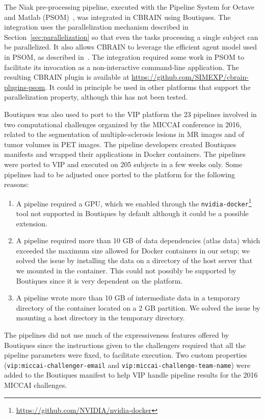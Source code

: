 \documentclass{article}
\begin{document}
The Niak pre-processing pipeline, executed with the Pipeline System
for Octave and Matlab (PSOM)~\cite{bellec2012pipeline}, was integrated
in CBRAIN using Boutiques. The integration uses the parallelization
mechanism described in Section~\ref{sec:parallelization} so that even
the tasks processing a single subject can be parallelized. It also
allows CBRAIN to leverage the efficient agent model used in PSOM, as
described in~\cite{GLAT-16}. The integration required some work in
PSOM to facilitate its invocation as a non-interactive command-line
application. The resulting CBRAIN plugin is available at
\url{https://github.com/SIMEXP/cbrain-plugins-psom}. It could in
principle be used in other platforms that support the parallelization
property, although this has not been tested.

Boutiques was also used to port to the VIP platform the 23 pipelines
involved in two computational challenges organized by the MICCAI
conference in 2016, related to the segmentation of multiple-sclerosis
lesions in MR images and of tumor volumes in PET images. The pipeline
developers created Boutiques manifests and wrapped their applications
in Docker containers. The pipelines were ported to VIP and executed on
205 subjects in a few weeks only. Some pipelines had to be adjusted
once ported to the platform for the following reasons:
\begin{enumerate}
\item A pipeline
  required a GPU, which we enabled through the
  \texttt{nvidia-docker}\footnote{\url{https://github.com/NVIDIA/nvidia-docker}}
  tool not supported in Boutiques by default although it could be a possible extension.
\item A pipeline required
  more than 10 GB of data dependencies (atlas data) which exceeded the
  maximum size allowed for Docker containers in our setup; we solved the
  issue by installing the data on a directory of the host server that we
  mounted in the container. This could not possibly be supported by
  Boutiques since it is very dependent on the platform.
\item A pipeline wrote more than 10 GB of intermediate data in a
  temporary directory of the container located on a 2 GB partition. We
  solved the issue by mounting a host directory in the temporary directory.
\end{enumerate}
The pipelines did not use much of the expressiveness features offered
by Boutiques since the instructions given to the challengers required
that all the pipeline parameters were fixed, to facilitate
execution. Two custom properties (\texttt{vip:miccai-challenger-email}
and \texttt{vip:miccai-challenge-team-name}) were added to the
Boutiques manifest to help VIP handle pipeline results for the 2016
MICCAI challenges.
\end{document}
